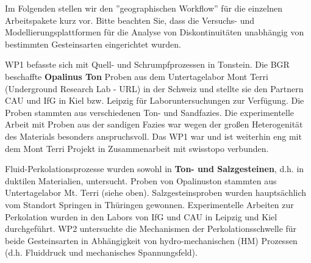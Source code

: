 Im Folgenden stellen wir den ''geographischen Workflow'' für die einzelnen Arbeitspakete kurz vor. Bitte beachten Sie, dass die Versuchs- und Modellierungsplattformen für die Analyse von Diskontinuitäten unabhängig von bestimmten Gesteinsarten eingerichtet wurden.

WP1 befasste sich mit Quell- und Schrumpfprozessen in Tonstein. Die BGR beschaffte \textbf{Opalinus Ton} Proben aus dem Untertagelabor Mont Terri (Underground Research Lab - URL) in der Schweiz und stellte sie den Partnern CAU und IfG in Kiel bzw. Leipzig für Laboruntersuchungen zur Verfügung. Die Proben stammten aus verschiedenen Ton- und Sandfazies. Die experimentelle Arbeit mit Proben aus der sandigen Fazies war wegen der gro{\ss}en Heterogenität des Materials besonders anspruchsvoll. Das WP1 war und ist weiterhin eng mit dem Mont Terri Projekt in Zusammenarbeit mit swisstopo verbunden.

Fluid-Perkolationsprozesse wurden sowohl in \textbf{Ton- und Salzgesteinen}, d.h. in duktilen Materialien, untersucht. Proben von Opalinuston stammten aus Untertagelabor Mt. Terri (siehe oben). Salzgesteinsproben wurden hauptsächlich vom Standort Springen in Thüringen gewonnen. Experimentelle Arbeiten zur Perkolation wurden in den Labors von IfG und CAU in Leipzig und Kiel durchgeführt. WP2 untersuchte die Mechanismen der Perkolationsschwelle für beide Gesteinsarten in Abhängigkeit von hydro-mechanischen (HM) Prozessen (d.h. Fluiddruck und mechanisches Spannungsfeld).

